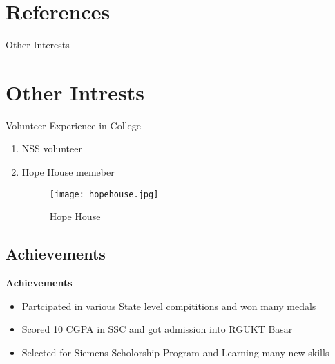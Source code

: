 \section*{References} 
\begin{frame}{Other Interests} 
\section{Other Intrests} 
\begin{block}{Volunteer Experience in College} 
\begin{enumerate} 
\item NSS volunteer 
\item {Hope House memeber\\ 
\begin{figure} 
\texttt{[image: hopehouse.jpg]} 
\caption{Hope House} 
\end{figure}}
 \end{enumerate} 
\end{block} 
\end{frame} 
\begin{frame} 
\section{Achievements} 
\textbf{Achievements} 
\begin{itemize} 
\item Partcipated in various State level compititions and won many medals 
\item {Scored 10 CGPA in SSC and got admission into RGUKT Basar } 
\item Selected for Siemens Scholorship Program and Learning many new skills 
\end{itemize} 
\end{frame}
 
